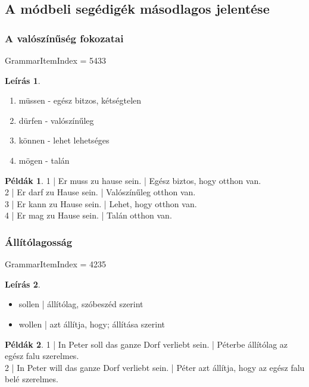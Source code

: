 \documentclass{article}
\theoremstyle{definition}
\newtheorem*{exmp}{Példák}
\newtheorem*{desc}{Leírás}
\begin{document}
\subsection{A módbeli segédigék másodlagos jelentése}

\subsubsection{A valószínűség fokozatai}

GrammarItemIndex = 5433

\begin{desc}
\begin{enumerate}
\item müssen - egész bitzos, kétségtelen
\item dürfen - valószínűleg
\item können - lehet lehetséges
\item mögen - talán
\end{enumerate}
\end{desc}

\begin{exmp}
1 | Er muss zu hause sein. | Egész biztos, hogy otthon van.\\
2 | Er darf zu Hause sein. | Valószínűleg otthon van.\\
3 | Er kann zu Hause sein. | Lehet, hogy otthon van.\\
4 | Er mag zu Hause sein. | Talán otthon van.\\
\end{exmp}

\subsubsection{Állítólagosság}

GrammarItemIndex = 4235

\begin{desc}
\begin{itemize}
\item sollen | állítólag, szóbeszéd szerint
\item wollen | azt állítja, hogy; állítása szerint
\end{itemize}
\end{desc}

\begin{exmp}
1 | In Peter soll das ganze Dorf verliebt sein. | Péterbe állítólag az egész falu szerelmes.\\
2 | In Peter will das ganze Dorf verliebt sein. | Péter azt állítja, hogy az egész falu belé szerelmes.\\
\end{exmp}
\end{document}
